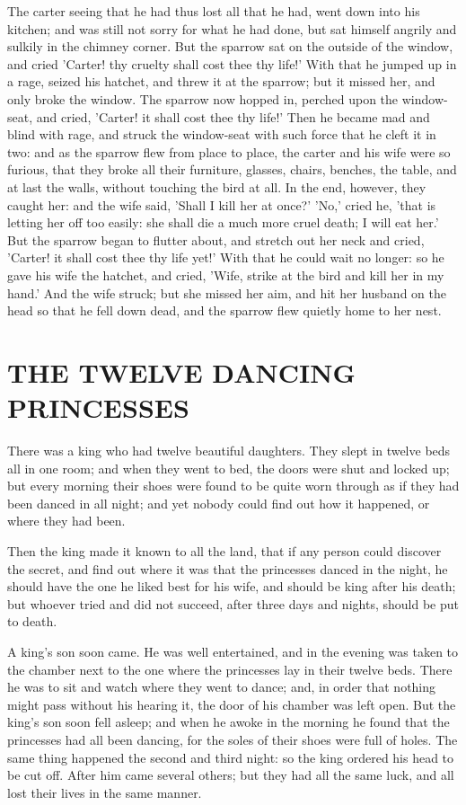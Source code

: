 \documentclass[12pt]{book}
\begin{document}
The carter seeing that he had thus lost all that he had, went down
into his kitchen; and was still not sorry for what he had done, but
sat himself angrily and sulkily in the chimney corner. But the sparrow
sat on the outside of the window, and cried 'Carter! thy cruelty shall
cost thee thy life!' With that he jumped up in a rage, seized his
hatchet, and threw it at the sparrow; but it missed her, and only
broke the window. The sparrow now hopped in, perched upon the window-
seat, and cried, 'Carter! it shall cost thee thy life!' Then he became
mad and blind with rage, and struck the window-seat with such force
that he cleft it in two: and as the sparrow flew from place to place,
the carter and his wife were so furious, that they broke all their
furniture, glasses, chairs, benches, the table, and at last the walls,
without touching the bird at all. In the end, however, they caught
her: and the wife said, 'Shall I kill her at once?' 'No,' cried he,
'that is letting her off too easily: she shall die a much more cruel
death; I will eat her.' But the sparrow began to flutter about, and
stretch out her neck and cried, 'Carter! it shall cost thee thy life
yet!' With that he could wait no longer: so he gave his wife the
hatchet, and cried, 'Wife, strike at the bird and kill her in my
hand.' And the wife struck; but she missed her aim, and hit her
husband on the head so that he fell down dead, and the sparrow flew
quietly home to her nest.



\chapter{THE TWELVE DANCING PRINCESSES}

There was a king who had twelve beautiful daughters. They slept in
twelve beds all in one room; and when they went to bed, the doors were
shut and locked up; but every morning their shoes were found to be
quite worn through as if they had been danced in all night; and yet
nobody could find out how it happened, or where they had been.

Then the king made it known to all the land, that if any person could
discover the secret, and find out where it was that the princesses
danced in the night, he should have the one he liked best for his
wife, and should be king after his death; but whoever tried and did
not succeed, after three days and nights, should be put to death.

A king's son soon came. He was well entertained, and in the evening
was taken to the chamber next to the one where the princesses lay in
their twelve beds. There he was to sit and watch where they went to
dance; and, in order that nothing might pass without his hearing it,
the door of his chamber was left open. But the king's son soon fell
asleep; and when he awoke in the morning he found that the princesses
had all been dancing, for the soles of their shoes were full of holes.
The same thing happened the second and third night: so the king
ordered his head to be cut off. After him came several others; but
they had all the same luck, and all lost their lives in the same
manner.
\end{document}
